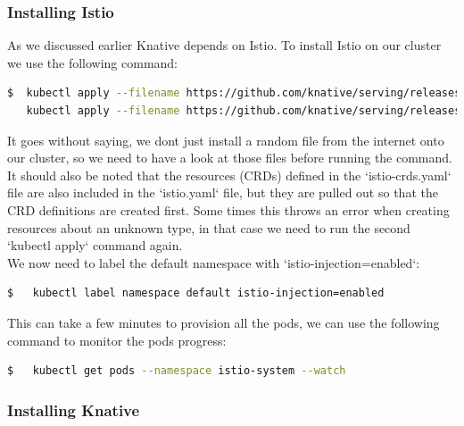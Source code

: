 \subsubsection{Installing Istio}
As we discussed earlier Knative depends on Istio. To install Istio on our cluster we use the following command:
\begin{lstlisting}[language=bash]
  $  kubectl apply --filename https://github.com/knative/serving/releases/download/v0.3.0/istio-crds.yaml && \
   kubectl apply --filename https://github.com/knative/serving/releases/download/v0.3.0/istio.yaml
\end{lstlisting}
It goes without saying, we dont just install a random file from the internet onto our cluster, so we need to have a look at those files before running the command. It should also be noted that the resources (CRDs) defined in the `istio-crds.yaml` file are also included in the `istio.yaml` file, but they are pulled out so that the CRD definitions are created first. Some times this throws an error when creating resources about an unknown type, in that case we need to run the second `kubectl apply` command again.
\\We now need to label the default namespace with `istio-injection=enabled`:
\begin{lstlisting}[language=bash]
  $   kubectl label namespace default istio-injection=enabled
\end{lstlisting}
This can take a few minutes to provision all the pods, we can use the following command to monitor the pods progress:
\begin{lstlisting}[language=bash]
  $   kubectl get pods --namespace istio-system --watch
\end{lstlisting}

\subsubsection{Installing Knative}

